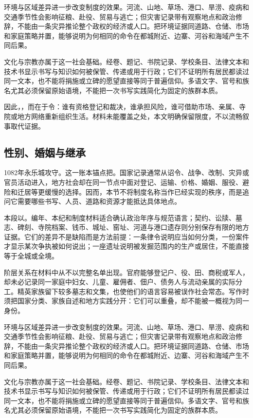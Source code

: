 环境与区域差异进一步改变制度的效果。河流、山地、草场、港口、旱涝、疫病和交通季节性会影响征粮、赴役、贸易与逃亡；但灾害记录带有观察地点和政治修辞，不能由一条灾异推论整个政权的经济或人口。把环境证据同道路、仓储、市场和家庭策略并置，能够说明为何相同的命令在都城附近、边寨、河谷和海域产生不同后果。

文化与宗教亦属于这一社会基础。经卷、题记、书院记录、学校条目、法律文本和技术书显示书写与知识如何被保管、传递或用于行政；它们不证明所有居民都读过同一文本，也不能将捐施或立碑的愿望直接等同于普遍信仰。多语文字、官号和族名尤其必须保留原始语境，不能把一次书写实践简化为固定的族群本质。

因此，，而在于令：谁有资格登记和裁决，谁承担风险，谁可借助市场、亲属、寺院或地方网络重新组织生活。材料未能覆盖之处，本文明确保留限度，不以流畅叙事取代证据。

\subsection{性别、婚姻与继承}

1082年永乐城攻守。这一账本锚点把。国家记录通常从诏令、战争、改制、灾异或官员活动进入，地方社会却在同一节点中面对登记、运输、价格、婚姻、服役、避险和迁居等更缓慢的选择。因而，本节不将制度名称当作已经实现的秩序，而是追问它需要哪些书写、人员、道路和资源才能抵达具体地点。

本段以。编年、本纪和制度材料适合确认政治年序与规范语言；契约、讼牍、墓志、碑刻、寺院档案、钱币、城址、窑址、河道与港口遗存则分别保存有限的地方证据。它们的差异不是缺陷而是方法前提：一条律令说明应当如何分类，一份案件才显示某次争执被如何说出；一座遗址说明被发掘范围内的生产或居住，不能直接等于全城或全境。

阶层关系在材料中从不以完整名单出现。官府能够登记户、役、田、商税或军人，却未必记录同一家庭中妇女、儿童、雇佣者、佃户、债务人与流动亲属的实际分工。精英家族留下较多墓志和文集，也使他们的语言容易被误作社会常态。写作时须把国家分类、家族自述和地方实践分开：它们可以重叠，却不能被一概视为同一身份。

环境与区域差异进一步改变制度的效果。河流、山地、草场、港口、旱涝、疫病和交通季节性会影响征粮、赴役、贸易与逃亡；但灾害记录带有观察地点和政治修辞，不能由一条灾异推论整个政权的经济或人口。把环境证据同道路、仓储、市场和家庭策略并置，能够说明为何相同的命令在都城附近、边寨、河谷和海域产生不同后果。

文化与宗教亦属于这一社会基础。经卷、题记、书院记录、学校条目、法律文本和技术书显示书写与知识如何被保管、传递或用于行政；它们不证明所有居民都读过同一文本，也不能将捐施或立碑的愿望直接等同于普遍信仰。多语文字、官号和族名尤其必须保留原始语境，不能把一次书写实践简化为固定的族群本质。

